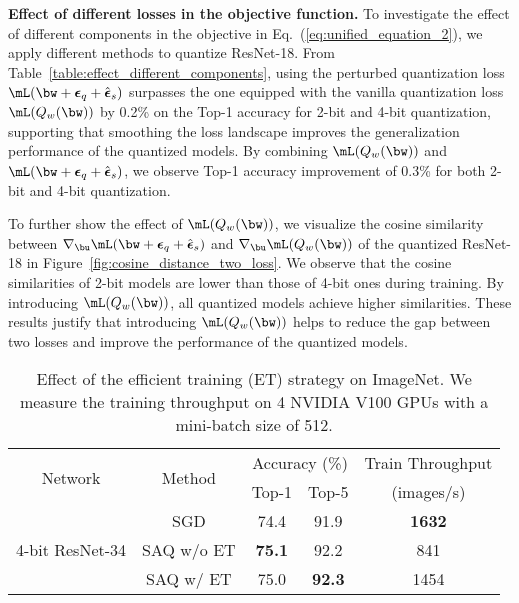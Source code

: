 

\noindent\textbf{Effect of different losses in the objective function.} To investigate the effect of different components in the objective in Eq.~(\ref{eq:unified_equation_2}), we apply different methods to quantize ResNet-18. 
From Table~\ref{table:effect_different_components}, using the perturbed quantization loss $\mL (\bw + \boldsymbol{\epsilon}_q + \hat{\boldsymbol{\epsilon}}_s)$ surpasses the one equipped with the vanilla quantization loss $\mL(Q_w(\bw))$ by 0.2\% on the Top-1 accuracy for 2-bit and 4-bit quantization, supporting that smoothing the loss landscape improves the generalization performance of the quantized models. By combining $\mL(Q_w(\bw))$ and $\mL (\bw + \boldsymbol{\epsilon}_q + \hat{\boldsymbol{\epsilon}}_s)$, we observe Top-1 accuracy improvement of 0.3\% for both 2-bit and 4-bit quantization. 

To further show the effect of $\mL(Q_w(\bw))$, we visualize the cosine similarity between $\nabla_{\bu} \mL(\bw + \boldsymbol{\epsilon}_q + \hat{\boldsymbol{\epsilon}}_s)$ and $\nabla_{\bu} \mL( Q_w(\bw) )$ of the quantized ResNet-18 in Figure~\ref{fig:cosine_distance_two_loss}. We observe that the cosine similarities of 2-bit models are lower than those of 4-bit ones during training. By introducing $\mL( Q_w(\bw) )$, all quantized models achieve higher similarities. These results justify that introducing $\mL(Q_w(\bw))$ helps to reduce the gap between two losses and improve the performance of the quantized models.

\begin{table}[t]
\renewcommand{\arraystretch}{1.3}
\caption{Effect of the efficient training (ET) strategy on ImageNet. We measure the training throughput on 4 NVIDIA V100 GPUs with a mini-batch size of 512.
}
\vspace{-0.1in}
\centering
\scalebox{0.72}
{
\begin{tabular}{ccccc}
\toprule
\multirow{2}{*}{Network} & \multirow{2}{*}{Method} & \multicolumn{2}{c}{Accuracy (\%)} & Train Throughput \\
& & Top-1 & Top-5 & (images/s) \\
\midrule
\multirow{3}{*}{4-bit ResNet-34} & SGD & 74.4 & 91.9 & \textbf{1632} \\
& SAQ w/o ET & \textbf{75.1} & 92.2 & 841 \\
& SAQ w/ ET & 75.0 & \textbf{92.3} & 1454 \\
\bottomrule
\end{tabular}
}
\label{table:effect_efficient_SAQ}
\vspace{-0.12in}
\end{table}



